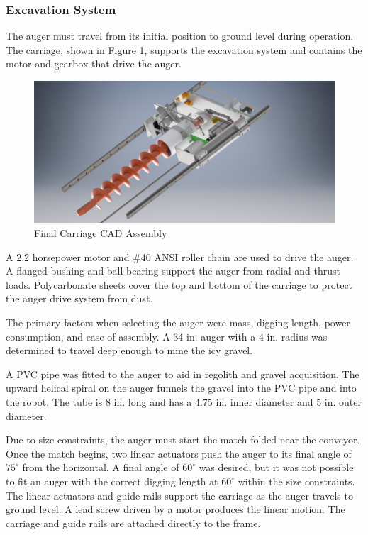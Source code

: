 \documentclass[class=article, crop=false]{standalone}
\begin{document}
	
	\subsubsection{Excavation System}
	
	The auger must travel from its initial position to ground level during operation. The carriage, shown in Figure \ref{fig:carriage-cad}, supports the excavation system and contains the motor and gearbox that drive the auger. 
	
	\FloatBarrier
	\begin{figure}[h]
	\centering
	 \includegraphics[width=0.8\linewidth]{09_Figures/carriage-cad.jpg}
	 \caption{Final Carriage CAD Assembly}
	 \label{fig:carriage-cad}
	\end{figure}
	\FloatBarrier
	
	A 2.2 horsepower motor and \#40 ANSI roller chain are used to drive the auger.  A flanged bushing and ball bearing support the auger from radial and thrust loads. Polycarbonate sheets cover the top and bottom of the carriage to protect the auger drive system from dust.
	
	The primary factors when selecting the auger were mass, digging length, power consumption, and ease of assembly. A 34 in. auger with a 4 in. radius was determined to travel deep enough to mine the icy gravel. 
	
	A PVC pipe was fitted to the auger to aid in regolith and gravel acquisition. The upward helical spiral on the auger funnels the gravel into the PVC pipe and into the robot. The tube is 8 in. long and has a 4.75 in. inner diameter and 5 in. outer diameter. 
	
	Due to size constraints, the auger must start the match folded near the conveyor. Once the match begins, two linear actuators push the auger to its final angle of $75^\circ$ from the horizontal. A final angle of $60^{\circ}$ was desired, but it was not possible to fit an auger with the correct digging length at $60^\circ$ within the size constraints. The linear actuators and guide rails support the carriage as the auger travels to ground level. A lead screw driven by a motor produces the linear motion. The carriage and guide rails are attached directly to the frame.
	
\end{document}
